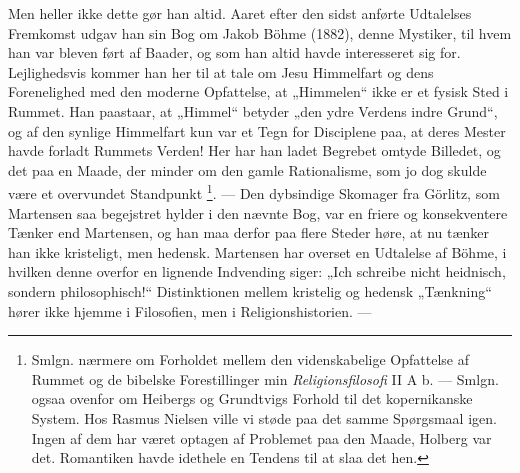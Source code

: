 \documentclass[12pt,a4paper,openany]{book}
\newcommand{\opage}[1]{\marginnote{\footnotesize\textit{[#1]}}}
\begin{document}
Men heller ikke dette gør han altid. Aaret efter den sidst anførte Udtalelses
Fremkomst udgav han sin Bog om Jakob Böhme (1882), denne Mystiker, til hvem han
var bleven ført af Baader, og som han altid havde interesseret sig for.
Lejlighedsvis kommer han her til at tale om Jesu Himmelfart og dens
Forenelighed med den moderne Opfattelse, at „Himmelen“ ikke er et fysisk Sted i
Rummet. Han paastaar, at „Himmel“ betyder „den ydre Verdens indre Grund“, og af
den synlige Himmelfart kun var et Tegn for Disciplene paa, at deres Mester
havde forladt Rummets Verden! Her har han ladet Begrebet omtyde Billedet, og
det paa en Maade, der minder om den gamle Rationalisme, som jo dog skulde være
et overvundet Standpunkt%
\footnote[2]{Smlgn. nærmere om Forholdet mellem den videnskabelige Opfattelse
af Rummet og de bibelske Forestillinger min \textit{Religionsfilosofi} II A b.
--- Smlgn. ogsaa ovenfor om Heibergs og Grundtvigs Forhold til det
kopernikanske System. Hos Rasmus Nielsen ville vi støde paa det samme
Spørgsmaal igen. Ingen af dem har været optagen af Problemet paa den Maade,
Holberg var det. Romantiken havde idethele en Tendens til at slaa det hen.}.
--- Den dybsindige Skomager
\setcounter{footnote}{0}%
\opage{145}fra Görlitz, som Martensen saa begejstret hylder i den nævnte Bog,
var en friere og konsekventere Tænker end Martensen, og han maa derfor paa
flere Steder høre, at nu tænker han ikke kristeligt, men hedensk. Martensen har
overset en Udtalelse af Böhme, i hvilken denne overfor en lignende Indvending
siger: „Ich schreibe nicht heidnisch, sondern philosophisch!“ Distinktionen
mellem kristelig og hedensk „Tænkning“ hører ikke hjemme i Filosofien, men i
Religionshistorien. ---
\end{document}
